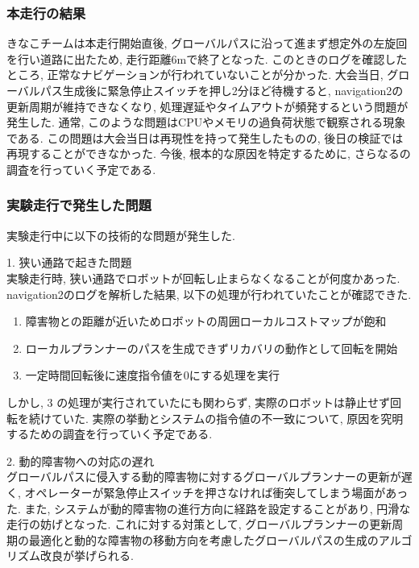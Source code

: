 \subsubsection{本走行の結果}
きなこチームは本走行開始直後, グローバルパスに沿って進まず想定外の左旋回を行い道路に出たため, 走行距離6mで終了となった. 
このときのログを確認したところ, 正常なナビゲーションが行われていないことが分かった. 
大会当日, グローバルパス生成後に緊急停止スイッチを押し2分ほど待機すると, navigation2の更新周期が維持できなくなり, 処理遅延やタイムアウトが頻発するという問題が発生した. 
通常, このような問題はCPUやメモリの過負荷状態で観察される現象である. 
この問題は大会当日は再現性を持って発生したものの, 後日の検証では再現することができなかった. 
今後, 根本的な原因を特定するために, さらなるの調査を行っていく予定である. 

\subsubsection{実験走行で発生した問題}
実験走行中に以下の技術的な問題が発生した. 

1. 狭い通路で起きた問題\\
実験走行時, 狭い通路でロボットが回転し止まらなくなることが何度かあった. 
navigation2のログを解析した結果, 以下の処理が行われていたことが確認できた. 

\begin{enumerate}
  \item 障害物との距離が近いためロボットの周囲ローカルコストマップが飽和
  \item ローカルプランナーのパスを生成できずリカバリの動作として回転を開始
  \item  一定時間回転後に速度指令値を0にする処理を実行
\end{enumerate}

しかし, 3 の処理が実行されていたにも関わらず, 実際のロボットは静止せず回転を続けていた. 
実際の挙動とシステムの指令値の不一致について, 原因を究明するための調査を行っていく予定である. 

2. 動的障害物への対応の遅れ\\
グローバルパスに侵入する動的障害物に対するグローバルプランナーの更新が遅く, オペレーターが緊急停止スイッチを押さなければ衝突してしまう場面があった. 
また, システムが動的障害物の進行方向に経路を設定することがあり, 円滑な走行の妨げとなった. 
これに対する対策として, グローバルプランナーの更新周期の最適化と動的な障害物の移動方向を考慮したグローバルパスの生成のアルゴリズム改良が挙げられる. 